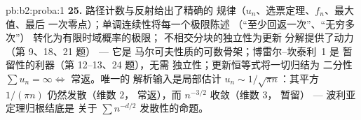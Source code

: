 \begin{solution}{pb:b2:proba:1}
\textbf{25.} 路径计数与反射给出了精确的
规律（$u_n$、选票定理、$f_n$、最大值、最后
一次零点）；单调连续性将每一个极限陈述
（“至少回返一次”、“无穷多次”）
转化为有限时域概率的极限；
不相交分块的独立性为更新
分解提供了动力（第 9、18、21 题） --- 它是
马尔可夫性质的可数骨架；博雷尔--坎泰利~1 是
暂留性的利器（第 12--13、24 题），无需
独立性；更新恒等式将一切归结为
二分性 $\sum u_n = \infty \iff$ 常返。唯一的
解析输入是局部估计 $u_n \sim 1/\sqrt{\pi
n}$：其平方 $1/(\pi n)$ 仍然发散（维数 $2$，
常返），而 $n^{-3/2}$ 收敛（维数 $3$，
暂留） --- 波利亚定理归根结底是
关于 $\sum n^{-d/2}$ 发散性的命题。
\end{solution}
